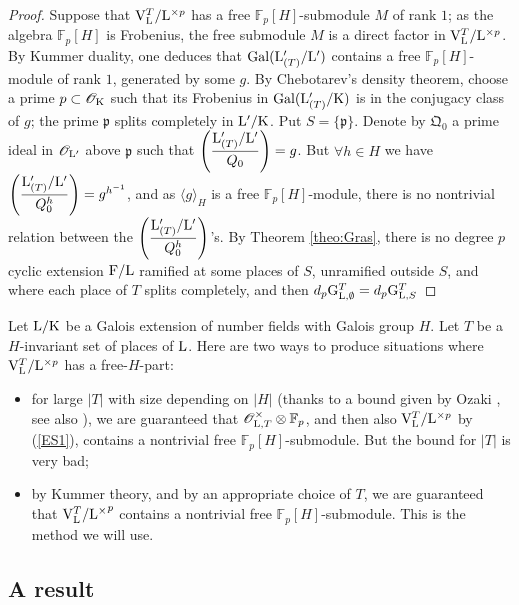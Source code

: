 \documentclass[12pt,a4paper,twoside,english]{smfart}
\def\fq{{\mathbb F}}
\def\p{{\mathfrak p}}
\def\QQ{{\mathfrak Q}}
\def\G{{\rm G}}
\def\K{{\rm K}}
\def\L{{\rm L}}
\def\F{{\rm F}}
\def\V{{\rm V}}
\def\O{{\mathcal O}}
\def\Gal{{\rm Gal}}
\def\FF#1#2{{\displaystyle{\left(\frac{#1}{#2}\right)}}}
\begin{document}
\begin{proof} 
Suppose that $\V_{\L}^T/\L^{\times p}$ has a  free $\fq_p[H]$-submodule $M$ of rank $1$; as the algebra $\fq_p[H]$ is Frobenius, the  free submodule $M$ is a  direct factor in $\V_{\L}^T/\L^{\times p}$. By Kummer duality, one deduces that $\Gal(\L'_{(T)}/\L')$ contains a free $\fq_p[H]$-module of rank $1$, generated by some $g$.  By Chebotarev's density theorem, choose a prime $\p \subset \O_\K$ such that its Frobenius in $\Gal(\L_{(T)}'/\K)$ is in the conjugacy class of $g$; the prime $\p$ splits completely in $\L'/\K$.  Put $S=\{\p\}$.
Denote by $\QQ_0$ a prime ideal in $\O_{\L'}$ above $\p$ such that $\FF{\L'_{(T)}/\L'}{\QQ_0}=g$. 
But $\forall h \in H$ we have
$\FF{\L'_{(T)}/\L'}{\QQ_0^h}=g^{h^{-1}}$, and as $\langle g \rangle_H$ is a free $\fq_p[H]$-module, there is no nontrivial relation between the $\FF{\L'_{(T)}/\L'}{\QQ_0^h}$'s. By Theorem \ref{theo:Gras}, there is no degree $p$ cyclic extension $\F/\L$ ramified at some places of $S$, unramified outside $S$, and where each place of $T$ splits completely, and then
$d_p \G_{\L,\emptyset}^T = d_p \G_{\L,S}^T$
\end{proof}

\begin{rema}
Let $\L/\K$ be a Galois extension of number fields with Galois group $H$. Let $T$ be a $H$-invariant set of places of $\L$. Here are  two ways to produce situations where  $\V_\L^T/\L^{\times p}$ has a free-$H$-part:
\begin{itemize}
\item[$(i)$] for large $|T|$ with size  depending on $|H|$ (thanks to a bound given by Ozaki \cite{Ozaki}, see also \cite{Hajir-Maire-analytic}), we are guaranteed that  $ \O_{\L,T}^{\times} \otimes \fq_p$, and then also $\V_\L^T/\L^{\times p}$ by (\ref{ES1}), contains a nontrivial free $\fq_p[H]$-submodule. 
But the bound for $|T|$ is very bad;
\item[$(ii)$] by  Kummer theory, and by an appropriate choice of $T$, we are guaranteed that   $\V_\L^{T}/{\L^\times}^p$ contains a nontrivial free $\fq_p[H]$-submodule. This is the
method we will use.
\end{itemize}
\end{rema}



\subsection{A result} \label{section:depth-inertia}
\end{document}
